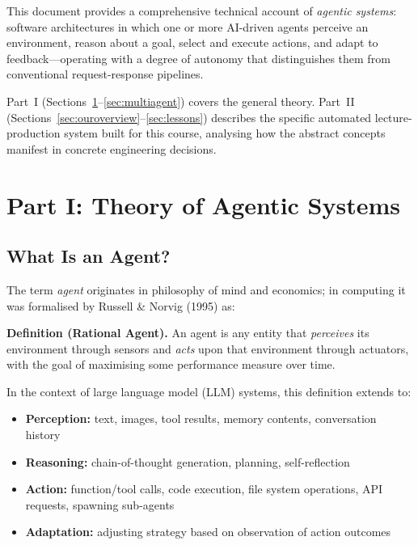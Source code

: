 \documentclass[12pt,a4paper]{article}
\begin{document}
This document provides a comprehensive technical account of \emph{agentic systems}:
software architectures in which one or more AI-driven agents perceive an environment,
reason about a goal, select and execute actions, and adapt to feedback---operating
with a degree of autonomy that distinguishes them from conventional request-response
pipelines.

Part~I (Sections~\ref{sec:theory}--\ref{sec:multiagent}) covers the general theory.
Part~II (Sections~\ref{sec:ouroverview}--\ref{sec:lessons}) describes the specific
automated lecture-production system built for this course, analysing how the abstract
concepts manifest in concrete engineering decisions.

\section{Part I: Theory of Agentic Systems}
\label{sec:theory}

\subsection{What Is an Agent?}

The term \textit{agent} originates in philosophy of mind and economics; in computing
it was formalised by Russell \& Norvig (1995) as:

\begin{mdframed}[backgroundcolor=lightblue, linecolor=agentblue, linewidth=1.5pt]
\textbf{Definition (Rational Agent).}
An agent is any entity that \emph{perceives} its environment through sensors and
\emph{acts} upon that environment through actuators, with the goal of maximising
some performance measure over time.
\end{mdframed}

\vspace{0.5em}
In the context of large language model (LLM) systems, this definition extends to:

\begin{itemize}[leftmargin=2em]
  \item \textbf{Perception:} text, images, tool results, memory contents, conversation history
  \item \textbf{Reasoning:} chain-of-thought generation, planning, self-reflection
  \item \textbf{Action:} function/tool calls, code execution, file system operations,
        API requests, spawning sub-agents
  \item \textbf{Adaptation:} adjusting strategy based on observation of action outcomes
\end{itemize}
\end{document}
